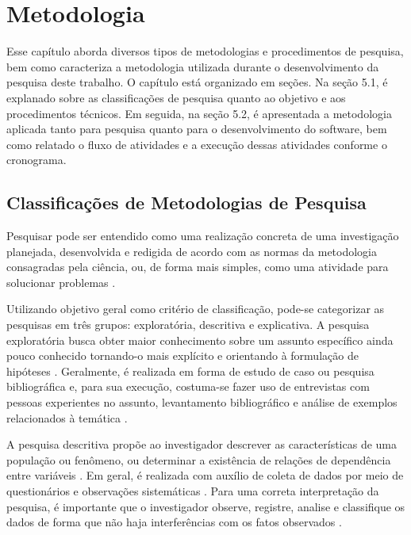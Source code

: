 \chapter[Metodologia]{Metodologia}
Esse capítulo aborda diversos tipos de metodologias e procedimentos de pesquisa, bem como caracteriza a metodologia utilizada durante o desenvolvimento da pesquisa deste trabalho. O capítulo está organizado em seções. Na seção 5.1, é explanado sobre as classificações de pesquisa quanto ao objetivo e aos procedimentos técnicos. Em seguida, na seção 5.2, é apresentada a metodologia aplicada tanto para pesquisa quanto para o desenvolvimento do software, bem como relatado o fluxo de atividades e a execução dessas atividades conforme o cronograma.

 \section{Classificações de Metodologias de Pesquisa}
  
Pesquisar pode ser entendido como uma realização concreta de uma investigação planejada, desenvolvida e redigida de acordo com as normas da metodologia consagradas pela ciência, ou, de forma mais simples, como uma atividade para solucionar problemas \cite{kauark2010} \cite{ruiz1996}. 

 \par
  \indent Utilizando objetivo geral como critério de classificação, pode-se categorizar as pesquisas em três grupos: exploratória, descritiva e explicativa. A pesquisa exploratória busca obter maior conhecimento sobre um assunto específico ainda pouco conhecido tornando-o mais explícito e orientando à formulação de hipóteses \cite{gil2002}. Geralmente, é realizada em forma de estudo de caso ou pesquisa bibliográfica \cite{rodrigues2007} e, para sua execução, costuma-se fazer uso de entrevistas com pessoas experientes no assunto, levantamento bibliográfico e análise de exemplos relacionados à temática \cite{gil2002}. 

 \par
  \indent A pesquisa descritiva propõe ao investigador descrever as características de uma população ou fenômeno, ou determinar a existência de relações de dependência entre variáveis \cite{gil2002}.  Em geral, é realizada com auxílio de coleta de dados por meio de questionários e observações sistemáticas \cite{tafner2007}. Para uma correta interpretação da pesquisa, é importante que o investigador observe, registre, analise e classifique os dados de forma que não haja interferências com os fatos observados \cite{rodrigues2007}. 

